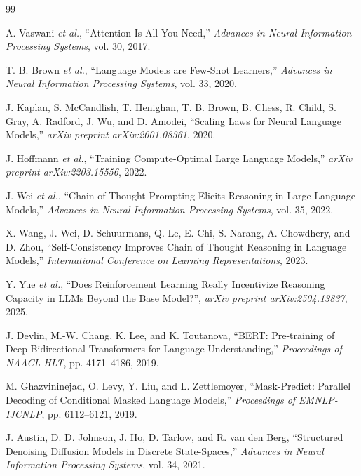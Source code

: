 \documentclass[12pt,a4paper,american,oneside]{scrartcl}
\begin{document}
\clearpage
\FloatBarrier
{}
{}
\begin{thebibliography}{99}

A. Vaswani \emph{et al.},
``Attention Is All You Need,''
\emph{Advances in Neural Information Processing Systems}, vol. 30, 2017.

T. B. Brown \emph{et al.},
``Language Models are Few-Shot Learners,''
\emph{Advances in Neural Information Processing Systems}, vol. 33, 2020.

J. Kaplan, S. McCandlish, T. Henighan, T. B. Brown, B. Chess, R. Child, S. Gray, A. Radford, J. Wu, and D. Amodei,
``Scaling Laws for Neural Language Models,''
\emph{arXiv preprint arXiv:2001.08361}, 2020.

J. Hoffmann \emph{et al.},
``Training Compute-Optimal Large Language Models,''
\emph{arXiv preprint arXiv:2203.15556}, 2022.

J. Wei \emph{et al.},
``Chain-of-Thought Prompting Elicits Reasoning in Large Language Models,''
\emph{Advances in Neural Information Processing Systems}, vol. 35, 2022.

X. Wang, J. Wei, D. Schuurmans, Q. Le, E. Chi, S. Narang, A. Chowdhery, and D. Zhou,
``Self-Consistency Improves Chain of Thought Reasoning in Language Models,''
\emph{International Conference on Learning Representations}, 2023.

Y. Yue \emph{et al.},
``Does Reinforcement Learning Really Incentivize Reasoning Capacity in LLMs Beyond the Base Model?'',
\emph{arXiv preprint arXiv:2504.13837}, 2025.

J. Devlin, M.-W. Chang, K. Lee, and K. Toutanova,
``BERT: Pre-training of Deep Bidirectional Transformers for Language Understanding,''
\emph{Proceedings of NAACL-HLT}, pp. 4171--4186, 2019.

M. Ghazvininejad, O. Levy, Y. Liu, and L. Zettlemoyer,
``Mask-Predict: Parallel Decoding of Conditional Masked Language Models,''
\emph{Proceedings of EMNLP-IJCNLP}, pp. 6112--6121, 2019.

J. Austin, D. D. Johnson, J. Ho, D. Tarlow, and R. van den Berg,
``Structured Denoising Diffusion Models in Discrete State-Spaces,''
\emph{Advances in Neural Information Processing Systems}, vol. 34, 2021.


\end{thebibliography}
\end{document}
